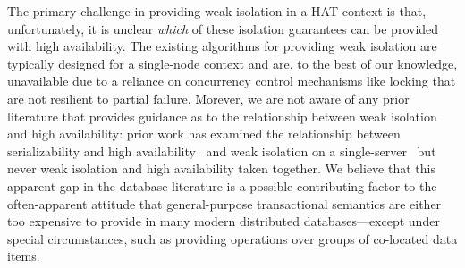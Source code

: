 The primary challenge in providing weak isolation in a HAT context is
that, unfortunately, it is unclear \textit{which} of these isolation
guarantees can be provided with high availability. The existing
algorithms for providing weak isolation are typically designed for a
single-node context and are, to the best of our knowledge, unavailable
due to a reliance on concurrency control mechanisms like locking that
are not resilient to partial failure. Morever, we are not aware of any
prior literature that provides guidance as to the relationship between
weak isolation and high availability: prior work has examined the
relationship between serializability and high
availability~\cite{davidson-survey} and weak isolation on a
single-server~\cite{adya, ansicritique} but never weak isolation and
high availability taken together. We believe that this apparent gap in
the database literature is a possible contributing factor to the
often-apparent attitude that general-purpose transactional semantics
are either too expensive to provide in many modern distributed
databases---except under special circumstances, such as providing
operations over groups of co-located data items.
